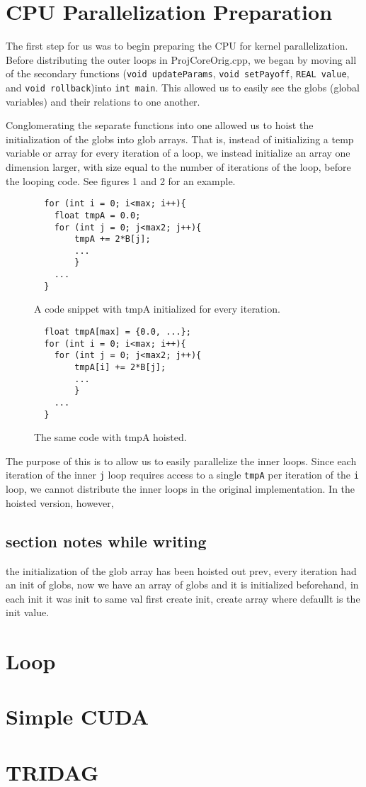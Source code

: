 \documentclass[]{report}
\title{}
\author{}
\begin{document}
\section{CPU Parallelization Preparation}
The first step for us was to begin preparing the CPU for kernel parallelization. Before distributing the outer loops in ProjCoreOrig.cpp,
 we began by moving all of the secondary functions (\texttt{void updateParams}, \texttt{void setPayoff}, \texttt{REAL value}, and \texttt{void rollback})into \texttt{int main}. This allowed us to easily see the globs (global variables) and their relations to one another.
 
 Conglomerating the separate functions into one allowed us to hoist the initialization of the globs into glob arrays. That is, instead of initializing a temp variable or array for every iteration of a loop, we instead initialize an array one dimension larger, with size equal to the number of iterations of the loop, before the looping code. See figures 1 and 2 for an example. 
 \begin{figure}
 \begin{lstlisting}
  for (int i = 0; i<max; i++){
  	float tmpA = 0.0;
  	for (int j = 0; j<max2; j++){
  		tmpA += 2*B[j];
  		...
  		}
  	...
  }
 \end{lstlisting}
 \caption{ A code snippet with tmpA initialized for every iteration.}
 \end{figure}
 \begin{figure}
 \begin{lstlisting}
  float tmpA[max] = {0.0, ...};
  for (int i = 0; i<max; i++){
  	for (int j = 0; j<max2; j++){
  		tmpA[i] += 2*B[j];
  		...
  		}
  	...
  }
 \end{lstlisting}
 \caption{ The same code with tmpA hoisted.}
 \end{figure}
  
The purpose of this is to allow us to easily parallelize the inner loops. Since each iteration of the inner \texttt{j} loop requires access to a single \texttt{tmpA} per iteration of the \texttt{i} loop, we cannot distribute the inner loops in the original implementation. In the hoisted version, however, 
\subsection{section notes while writing}
the initialization of the glob array has been hoisted out
prev, every iteration had an init of globs, now we have an array of globs and it is initialized beforehand, in each init it was init to same val
first create init, create array where defaullt is the init value.
\section{Loop}

\section{Simple CUDA}

\section{TRIDAG}
\end{document}
